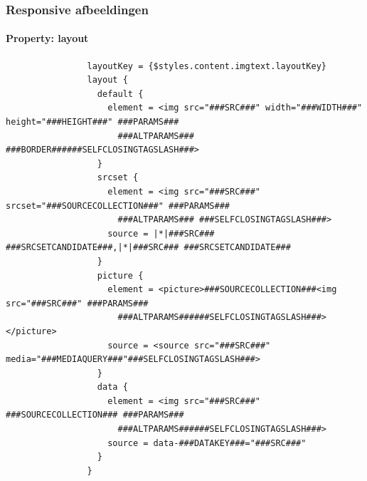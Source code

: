 \begin{frame}[fragile]
	\frametitle{Responsive afbeeldingen}
	\framesubtitle{Property: layout}


			\lstset{
				basicstyle=\tiny\ttfamily
			}

			\begin{lstlisting}
				layoutKey = {$styles.content.imgtext.layoutKey}
				layout {
				  default {
				    element = <img src="###SRC###" width="###WIDTH###" height="###HEIGHT###" ###PARAMS###
				      ###ALTPARAMS### ###BORDER######SELFCLOSINGTAGSLASH###>
				  }
				  srcset {
				    element = <img src="###SRC###" srcset="###SOURCECOLLECTION###" ###PARAMS###
				      ###ALTPARAMS### ###SELFCLOSINGTAGSLASH###>
				    source = |*|###SRC### ###SRCSETCANDIDATE###,|*|###SRC### ###SRCSETCANDIDATE###
				  }
				  picture {
				    element = <picture>###SOURCECOLLECTION###<img src="###SRC###" ###PARAMS###
				      ###ALTPARAMS######SELFCLOSINGTAGSLASH###></picture>
				    source = <source src="###SRC###" media="###MEDIAQUERY###"###SELFCLOSINGTAGSLASH###>
				  }
				  data {
				    element = <img src="###SRC###" ###SOURCECOLLECTION### ###PARAMS###
				      ###ALTPARAMS######SELFCLOSINGTAGSLASH###>
				    source = data-###DATAKEY###="###SRC###"
				  }
				}
			\end{lstlisting}

\end{frame}


